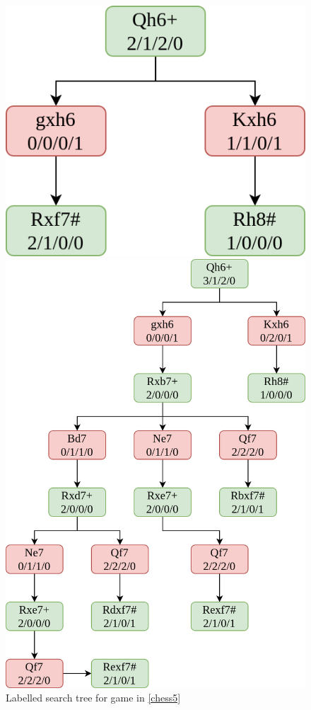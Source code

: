 \begin{figure}[H]
    \begin{minipage}{0.475\textwidth}
        \centering
        \includegraphics[width=\textwidth]{project/img/trees/1.drawio.png}
        \caption{Labelled search tree for game in \ref{chess5}}
        \label{tree1}
    \end{minipage}
    \hspace{0.05\textwidth}
    \begin{minipage}{0.475\textwidth}
        \centering
        \includegraphics[width=\textwidth]{project/img/trees/2.drawio.png}

\end{minipage}
\end{figure}
